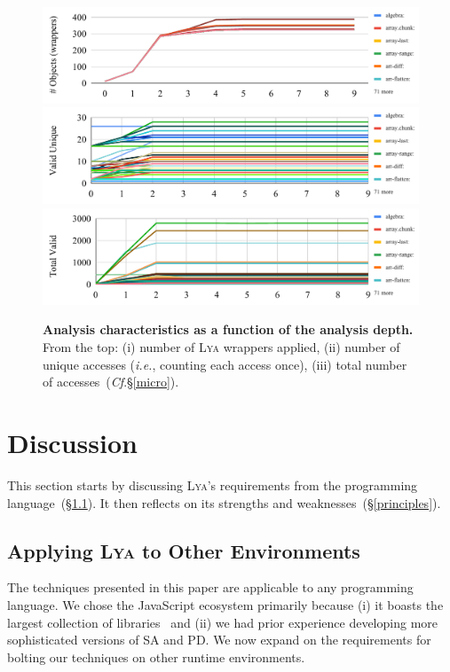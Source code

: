 \documentclass[letterpaper,twocolumn,10pt]{article}
\def\ie{{\em i.e.}, }
\newcommand{\cf}[1]{(\emph{Cf}.\S\ref{#1})}
\newcommand{\sx}[1]{(\S\ref{#1})}
\newcommand{\sys}{{\scshape Lya}\xspace}
\begin{document}
\begin{figure}[t]
  \centering
  \includegraphics[width=\columnwidth]{./figs/lya_n_obj}
  \includegraphics[width=\columnwidth]{./figs/lya_unique_valid}
  \includegraphics[width=\columnwidth]{./figs/lya_total_valid}
  \caption{
    \textbf{Analysis characteristics as a function of the analysis depth.}
    From the top:
    (i) number of \sys wrappers applied,
    (ii) number of unique accesses (\ie counting each access once),
    (iii) total number of accesses~\cf{micro}.
  }
  \label{fig:objects}
\end{figure}

\section{Discussion}
\label{diss}

This section starts by discussing \sys's requirements from the programming language~\sx{reqs}. It then reflects on its strengths and weaknesses~\sx{principles}.

\subsection{Applying \sys to Other Environments}
\label{reqs}

The techniques presented in this paper are applicable to any programming language.
We chose the JavaScript ecosystem %
primarily because
  (i) it boasts the largest collection of libraries~\cite{modulecounts} and
	(ii) we had prior experience developing more sophisticated versions of SA and PD.
We now expand on the requirements for bolting our techniques on other runtime environments.
\end{document}
